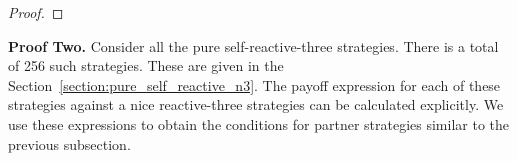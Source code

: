 \documentclass{article}
\theoremstyle{definition}
\begin{document}
\begin{proof}
\end{proof}

{\bf Proof Two.} Consider all the pure self-reactive-three strategies. There is
a total of 256 such strategies. These are given in the
Section~\ref{section:pure_self_reactive_n3}. The payoff expression for each of
these strategies against a nice reactive-three strategies can be calculated
explicitly. We use these expressions to obtain the conditions for partner
strategies similar to the previous subsection.
\end{document}
